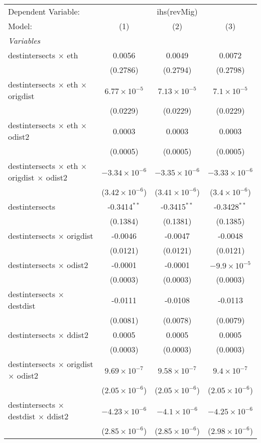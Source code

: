 \begin{tabular}{lccc}
\tabularnewline\midrule\midrule
Dependent Variable:&\multicolumn{3}{c}{ihs(revMig)}\\
Model:&(1) & (2) & (3)\\
\midrule \emph{Variables}&   &   &  \\
destintersects $\times $ eth & 0.0056 & 0.0049 & 0.0072\\
  &(0.2786) & (0.2794) & (0.2798)\\
destintersects $\times $ eth $\times $ origdist & $6.77\times 10^{-5}$ & $7.13\times 10^{-5}$ & $7.1\times 10^{-5}$\\
  &(0.0229) & (0.0229) & (0.0229)\\
destintersects $\times $ eth $\times $ odist2 & 0.0003 & 0.0003 & 0.0003\\
  &(0.0005) & (0.0005) & (0.0005)\\
destintersects $\times $ eth $\times $ origdist $\times $ odist2 & $-3.34\times 10^{-6}$ & $-3.35\times 10^{-6}$ & $-3.33\times 10^{-6}$\\
  &($3.42\times 10^{-6}$) & ($3.41\times 10^{-6}$) & ($3.4\times 10^{-6}$)\\
destintersects & -0.3414$^{**}$ & -0.3415$^{**}$ & -0.3428$^{**}$\\
  &(0.1384) & (0.1381) & (0.1385)\\
destintersects $\times $ origdist & -0.0046 & -0.0047 & -0.0048\\
  &(0.0121) & (0.0121) & (0.0121)\\
destintersects $\times $ odist2 & -0.0001 & -0.0001 & $-9.9\times 10^{-5}$\\
  &(0.0003) & (0.0003) & (0.0003)\\
destintersects $\times $ destdist & -0.0111 & -0.0108 & -0.0113\\
  &(0.0081) & (0.0078) & (0.0079)\\
destintersects $\times $ ddist2 & 0.0005 & 0.0005 & 0.0005\\
  &(0.0003) & (0.0003) & (0.0003)\\
destintersects $\times $ origdist $\times $ odist2 & $9.69\times 10^{-7}$ & $9.58\times 10^{-7}$ & $9.4\times 10^{-7}$\\
  &($2.05\times 10^{-6}$) & ($2.05\times 10^{-6}$) & ($2.05\times 10^{-6}$)\\
destintersects $\times $ destdist $\times $ ddist2 & $-4.23\times 10^{-6}$ & $-4.1\times 10^{-6}$ & $-4.25\times 10^{-6}$\\
  &($2.85\times 10^{-6}$) & ($2.85\times 10^{-6}$) & ($2.98\times 10^{-6}$)\\

\end{tabular}
